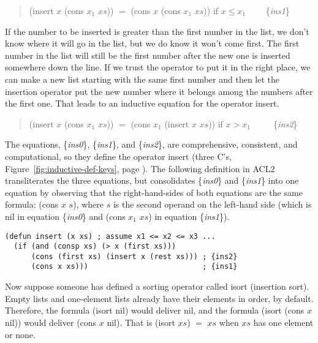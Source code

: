 \begin{quote}
\textsf{(insert $x$ (cons $x_1$ $xs$)) $=$ (cons $x$ (cons $x_1$ $xs$))} if $x \le x_1$ ~~~~\{\emph{ins1}\}
\end{quote}

If the number to be inserted is greater than the first number
in the list, we don't know where it will go in the list,
but we do know it won't come first.
The first number in the list will still be the first number
after the new one is inserted somewhere down the line.
If we trust the operator to put it in the right place,
we can make a new list starting with the same first number
and then  let the insertion operator put the new number
where it belongs among the numbers after the first one.
That leads to an inductive equation for the operator \textsf{insert}.

\begin{quote}
\textsf{(insert $x$ (cons $x_1$ $xs$)) $=$ (cons $x_1$ (insert $x$ $xs$))} if $x > x_1$ ~~~~ \{\emph{ins2}\}
\end{quote}

The equations, \{\emph{ins0}\}, \{\emph{ins1}\}, and \{\emph{ins2}\},
are comprehensive, consistent, and computational,
so they define the operator \textsf{insert}
(three C's, Figure~\ref{fig:inductive-def-keys}, page \pageref{fig:inductive-def-keys}).
The following definition in ACL2 transliterates the three equations,
but consolidates \{\emph{ins0}\} and \{\emph{ins1}\} into one equation
by observing that the right-hand-sides of both equations
are the same formula: \textsf{(cons $x$ $s$)}, where $s$ is the second operand
on the left-hand side
(which is \textsf{nil} in equation \{\emph{ins0}\} and
\textsf{(cons $x_1$ $xs$)} in equation \{\emph{ins1}\}).

\label{defun:insert-isort}
\begin{Verbatim}
(defun insert (x xs) ; assume x1 <= x2 <= x3 ...
  (if (and (consp xs) (> x (first xs)))
      (cons (first xs) (insert x (rest xs))) ; {ins2}
      (cons x xs)))                          ; {ins1}
\end{Verbatim}

Now suppose someone has defined a sorting operator called \textsf{isort}
(insertion sort).
Empty lists and one-element lists already have their
elements in order, by default.
Therefore, the formula \textsf{(isort nil}) would deliver \textsf{nil},
and the formula \textsf{(isort (cons $x$ nil))} would deliver
\textsf{(cons $x$ nil)}.
That is \textsf{(isort $xs$) $=$ $xs$} when $xs$ has one element or none.

